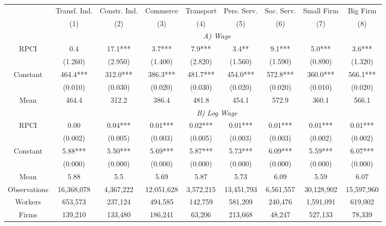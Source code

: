 \begin{tabular}{ccccccccc}
\toprule
\toprule
      & Transf. Ind. & Constr. Ind. & Commerce & Transport & Pers. Serv. & Soc. Serv. & Small Firm & Big Firm \\
      & (1)   & (2)   & (3)   & (4)   & (5)   & (6)   & (7)   & (8) \\
\cmidrule{2-9}      & \multicolumn{8}{c}{\textit{A) Wage}} \\
\midrule
RPCI  & 0.4   & 17.1*** & 3.7*** & 7.9*** & 3.4** & 9.1*** & 5.0*** & 3.6*** \\
      & (1.260) & (2.950) & (1.400) & (2.820) & (1.560) & (1.590) & (0.890) & (1.320) \\
Constant & 464.4*** & 312.0*** & 386.3*** & 481.7*** & 454.0*** & 572.8*** & 360.0*** & 566.1*** \\
      & (0.010) & (0.030) & (0.020) & (0.030) & (0.020) & (0.020) & (0.010) & (0.020) \\
Mean  & 464.4 & 312.2 & 386.4 & 481.8 & 454.1 & 572.9 & 360.1 & 566.1 \\
\cmidrule{2-9}      & \multicolumn{8}{c}{\textit{B) Log Wage}} \\
\midrule
RPCI  & 0.00  & 0.04*** & 0.01*** & 0.02*** & 0.01*** & 0.01*** & 0.01*** & 0.01*** \\
      & (0.002) & (0.005) & (0.003) & (0.005) & (0.003) & (0.003) & (0.002) & (0.002) \\
Constant & 5.88*** & 5.50*** & 5.69*** & 5.87*** & 5.73*** & 6.09*** & 5.59*** & 6.07*** \\
      & (0.000) & (0.000) & (0.000) & (0.000) & (0.000) & (0.000) & (0.000) & (0.000) \\
Mean  & 5.88  & 5.5   & 5.69  & 5.87  & 5.73  & 6.09  & 5.59  & 6.07 \\
\midrule
Observations & 16,368,078 & 4,367,222 & 12,051,628 & 3,572,215 & 13,451,793 & 6,561,557 & 30,128,902 & 15,597,960 \\
Workers & 653,573 & 237,124 & 494,585 & 142,759 & 581,209 & 240,476 & 1,591,091 & 619,002 \\
Firms & 139,210 & 133,480 & 186,241 & 63,206 & 213,668 & 48,247 & 527,133 & 78,339 \\
\bottomrule
\bottomrule
\end{tabular}%
